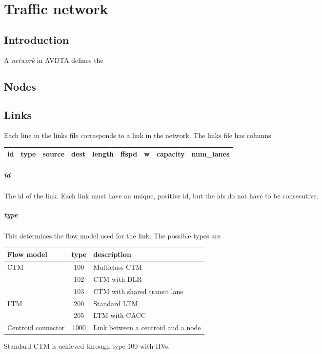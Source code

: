 \chapter{Traffic network}
\label{sec:network}


\section{Introduction}
A \textit{network} in AVDTA defines the 


\section{Nodes}
\label{sec:nodes}

\section{Links}
\label{sec:links}

Each line in the links file corresponds to a link in the network. The links file has columns
\begin{center}
\begin{tabular}{ccccccccc}
\hline
id & type & source & dest & length & ffspd & w & capacity & num\_lanes \\\hline
\end{tabular}
\end{center}
\paragraph*{id} The id of the link. Each link must have an unique, positive id, but the ids do not have to be consecutive.
\paragraph*{type} This determines the flow model used for the link. The possible types are
\begin{center}
\begin{tabular}{lcl}
\hline Flow model & type & description\\\hline
CTM & 100 & Multiclass CTM~\cite{levin2016multiclass} \\
& 102 & CTM with DLR~\cite{levin2016cell}\\
& 103 & CTM with shared transit lane\\\hline
LTM & 200 & Standard LTM~\cite{yperman2005link, yperman2007link}\\
& 205 & LTM with CACC\\\hline
Centroid connector & 1000 & Link between a centroid and a node\\\hline
\end{tabular}
\end{center}
Standard CTM is achieved through type 100 with HVs.
